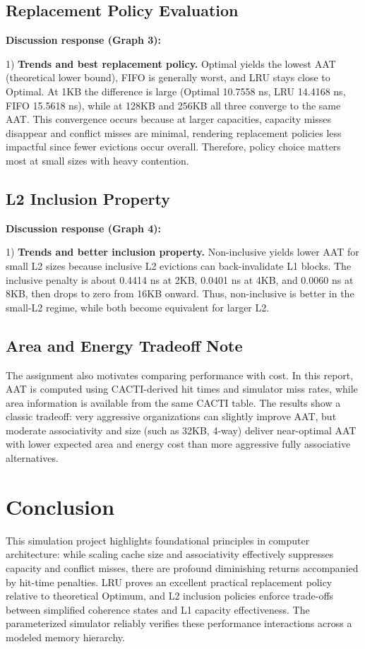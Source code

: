 \documentclass[12pt]{article}
\begin{document}
\pagebreak
\subsection{Replacement Policy Evaluation}

\textbf{Discussion response (Graph 3):}

1) \textbf{Trends and best replacement policy.} Optimal yields the lowest AAT (theoretical lower bound), FIFO is generally worst, and LRU stays close to Optimal. At 1KB the difference is large (Optimal 10.7558 ns, LRU 14.4168 ns, FIFO 15.5618 ns), while at 128KB and 256KB all three converge to the same AAT. This convergence occurs because at larger capacities, capacity misses disappear and conflict misses are minimal, rendering replacement policies less impactful since fewer evictions occur overall. Therefore, policy choice matters most at small sizes with heavy contention.

\pagebreak
\subsection{L2 Inclusion Property}

\textbf{Discussion response (Graph 4):}

1) \textbf{Trends and better inclusion property.} Non-inclusive yields lower AAT for small L2 sizes because inclusive L2 evictions can back-invalidate L1 blocks. The inclusive penalty is about 0.4414 ns at 2KB, 0.0401 ns at 4KB, and 0.0060 ns at 8KB, then drops to zero from 16KB onward. Thus, non-inclusive is better in the small-L2 regime, while both become equivalent for larger L2.

\subsection{Area and Energy Tradeoff Note}
The assignment also motivates comparing performance with cost. In this report, AAT is computed using CACTI-derived hit times and simulator miss rates, while area information is available from the same CACTI table. The results show a classic tradeoff: very aggressive organizations can slightly improve AAT, but moderate associativity and size (such as 32KB, 4-way) deliver near-optimal AAT with lower expected area and energy cost than more aggressive fully associative alternatives.

\pagebreak
\section{Conclusion}
This simulation project highlights foundational principles in computer architecture: while scaling cache size and associativity effectively suppresses capacity and conflict misses, there are profound diminishing returns accompanied by hit-time penalties. LRU proves an excellent practical replacement policy relative to theoretical Optimum, and L2 inclusion policies enforce trade-offs between simplified coherence states and L1 capacity effectiveness. The parameterized simulator reliably verifies these performance interactions across a modeled memory hierarchy.
\end{document}
